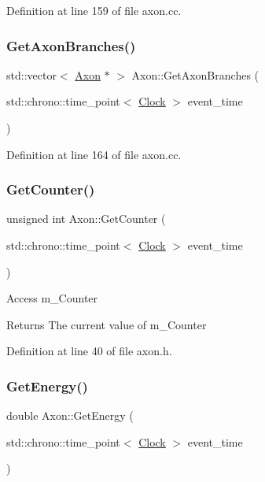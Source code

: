 Definition at line 159 of file axon.\+cc.

\mbox{\label{class_axon_adf5796ef2f72ce56516b37e7e09e9d6c}} 
\subsubsection{\texorpdfstring{Get\+Axon\+Branches()}{GetAxonBranches()}}
{\footnotesize\ttfamily std\+::vector$<$ \mbox{\hyperlink{class_axon}{Axon}} $\ast$ $>$ Axon\+::\+Get\+Axon\+Branches (\begin{DoxyParamCaption}\item[{std\+::chrono\+::time\+\_\+point$<$ \mbox{\hyperlink{universe_8h_a0ef8d951d1ca5ab3cfaf7ab4c7a6fd80}{Clock}} $>$}]{event\+\_\+time }\end{DoxyParamCaption})}



Definition at line 164 of file axon.\+cc.

\mbox{\label{class_axon_a390ff1f3d85034fc85bcafc7374da9c7}} 
\subsubsection{\texorpdfstring{Get\+Counter()}{GetCounter()}}
{\footnotesize\ttfamily unsigned int Axon\+::\+Get\+Counter (\begin{DoxyParamCaption}\item[{std\+::chrono\+::time\+\_\+point$<$ \mbox{\hyperlink{universe_8h_a0ef8d951d1ca5ab3cfaf7ab4c7a6fd80}{Clock}} $>$}]{event\+\_\+time }\end{DoxyParamCaption})\hspace{0.3cm}{\ttfamily [inline]}}

Access m\+\_\+\+Counter \begin{DoxyReturn}{Returns}
The current value of m\+\_\+\+Counter 
\end{DoxyReturn}


Definition at line 40 of file axon.\+h.

\mbox{\label{class_axon_a37a1ca2b0454d77dc0bc93e493feb0ce}} 
\subsubsection{\texorpdfstring{Get\+Energy()}{GetEnergy()}}
{\footnotesize\ttfamily double Axon\+::\+Get\+Energy (\begin{DoxyParamCaption}\item[{std\+::chrono\+::time\+\_\+point$<$ \mbox{\hyperlink{universe_8h_a0ef8d951d1ca5ab3cfaf7ab4c7a6fd80}{Clock}} $>$}]{event\+\_\+time }\end{DoxyParamCaption})\hspace{0.3cm}{\ttfamily [inline]}}



